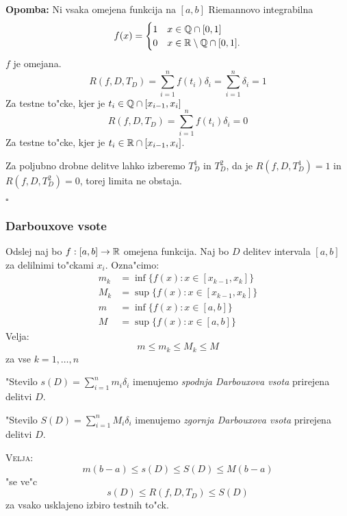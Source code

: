\textbf{Opomba:} Ni vsaka omejena funkcija na $[a, b]$ Riemannovo integrabilna
\begin{equation*}
f(x) = \begin{cases}
1 & x \in \mathbb{Q} \cap [0, 1] \\
0 & x \in \mathbb{R} \setminus \mathbb{Q} \cap [0, 1].
\end{cases}
\end{equation*}
$f$ je omejana. 
\begin{equation*}
R(f, D, T_D) = \sum_{i = 1}^n f(t_i) \delta_i = \sum_{i = 1}^{n} \delta_i = 1
\end{equation*}
Za testne to"cke, kjer je $t_i \in \mathbb{Q} \cap [x_{i-1}, x_i]$
\begin{equation*}
R(f, D, T_D) = \sum_{i = 1}^n f(t_i) \delta_i = 0
\end{equation*}
Za testne to"cke, kjer je $t_i \in \mathbb{R} \cap [x_{i-1}, x_i]$.

Za poljubno drobne delitve lahko izberemo $T_D^1$ in $T_D^2$, da je $R(f, D, T_D^1) = 1$ in $R(f, D, T_D^2) = 0$, torej limita ne obstaja.

\hfill $\square$
%
\subsubsection{Darbouxove vsote}
Odslej naj bo $f: [a, b] \to \mathbb{R}$ omejena funkcija. Naj bo $D$ delitev intervala $[a, b]$ za delilnimi to"ckami $x_i$. Ozna"cimo:
\begin{align*}
m_k &= \inf \{f(x): x \in [x_{k-1}, x_k]\} \\
M_k &= \sup \{f(x): x \in [x_{k-1}, x_k]\} \\
m &= \inf \{f(x): x \in [a, b]\} \\
M &= \sup \{f(x): x \in [a, b]\}
\end{align*}
Velja:
\begin{equation*}
m \leq m_k \leq M_k \leq M
\end{equation*}
za vse $k = 1, \ldots, n$

 "Stevilo $s(D) = \sum_{i = 1}^n m_i \delta_i$ imenujemo \emph{spodnja Darbouxova vsota} prirejena delitvi $D$.

"Stevilo $S(D) = \sum_{i = 1}^{n} M_i \delta_i$ imenujemo \emph{zgornja Darbouxova vsota} prirejena delitvi $D$.

\textsc{Velja:}
\begin{equation*}
m(b-a) \leq s(D) \leq S(D) \leq M(b-a)
\end{equation*}
"se ve"c
\begin{equation*}
s(D) \leq R(f, D, T_D) \leq S(D)
\end{equation*}
za vsako usklajeno izbiro testnih to"ck.


